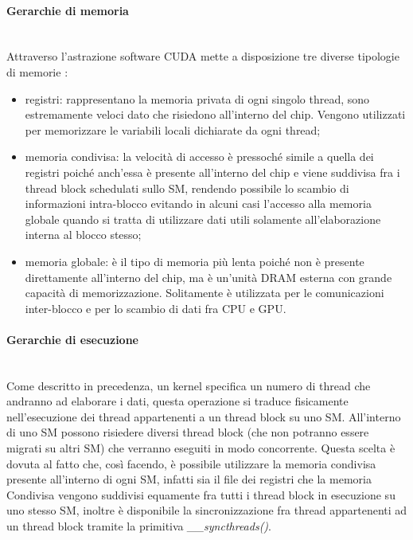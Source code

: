 \paragraph{Gerarchie di memoria}\mbox{}
\\
Attraverso l'astrazione software CUDA mette a disposizione tre diverse
tipologie di memorie \cite{kirk2007nvidia}:

\begin{itemize}
    \item registri: rappresentano la memoria privata di ogni singolo thread,
        sono estremamente veloci dato che risiedono all'interno del chip.
        Vengono utilizzati per memorizzare le
        variabili locali dichiarate da ogni thread;
    
    \item memoria condivisa: la velocità di accesso è pressoché simile a quella
        dei registri poiché anch'essa è presente all'interno del chip e viene
        suddivisa fra i thread block schedulati sullo SM,
        rendendo possibile lo scambio di informazioni intra-blocco evitando
        in alcuni casi l'accesso alla memoria globale quando si tratta di
        utilizzare dati utili solamente all'elaborazione interna al
        blocco stesso;

    \item memoria globale: è il tipo di memoria più lenta poiché non è presente
        direttamente all'interno del chip, ma è un'unità DRAM esterna con grande
        capacità di memorizzazione. Solitamente è utilizzata per le
        comunicazioni inter-blocco e per lo scambio di dati fra CPU e GPU.
\end{itemize}

\paragraph{Gerarchie di esecuzione}\mbox{}
\\
Come descritto in precedenza, un kernel specifica un numero di thread che
andranno ad elaborare i dati, questa operazione si traduce fisicamente
nell'esecuzione dei thread appartenenti a un thread block su uno
SM. All'interno di uno SM possono risiedere
diversi thread block (che non potranno essere migrati su altri SM)
che verranno eseguiti in modo concorrente. Questa scelta è dovuta al fatto
che, così facendo, è possibile utilizzare la memoria condivisa presente
all'interno di ogni SM, infatti sia il file dei registri che la memoria
Condivisa vengono suddivisi equamente fra tutti i thread block in esecuzione
su uno stesso SM, inoltre è disponibile la sincronizzazione fra thread
appartenenti ad un thread block tramite la primitiva \textit{\_\_syncthreads()}.

